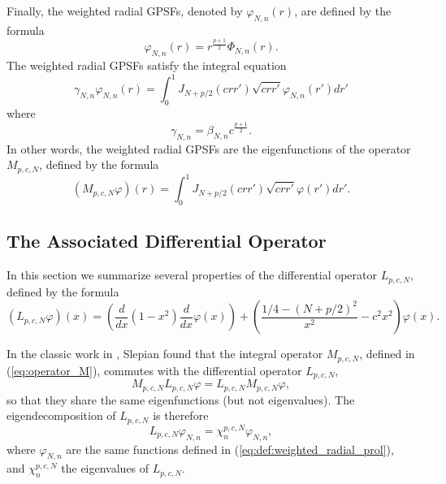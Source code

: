 \documentclass[12pt]{article}
\begin{document}
Finally, the weighted radial GPSFs, denoted by $\varphi_{N,n}(r)$, are defined by the formula
\begin{equation}\label{eq:def:weighted_radial_prol}
\varphi_{N,n}(r) = r^{\frac{p+1}{2}} \Phi_{N,n}(r).
\end{equation}
The weighted radial GPSFs satisfy the integral equation
\begin{equation}\label{eq:weighted_radial_prol:eig}
  \gamma_{N,n} \varphi_{N,n}(r) = \int_0^1 {J_{N+p/2}(crr')} \sqrt{crr'} \varphi_{N,n}(r') dr' 
\end{equation}
where 
\begin{equation}\label{eq:gamma}
  \gamma_{N,n} = \beta_{N,n} c^{\frac{p+1}{2}}.
\end{equation}
In other words, the weighted radial GPSFs are the eigenfunctions of the operator $M_{p,c,N}$, defined by the formula
\begin{equation}\label{eq:operator_M}
 \left( M_{p,c,N} \varphi \right)(r) = \int_0^1 {J_{N+p/2}(crr')} \sqrt{crr'} \varphi(r') dr' .
\end{equation}



%
%
%
\subsection{The Associated Differential Operator}

In this section we summarize several properties of the differential operator 
$L_{p,c,N}$, defined by the formula
\begin{equation}\label{eq:operator_L}
   \left( L_{p,c,N} \varphi \right)(x) = \left( \frac{d}{dx}(1-x^2)\frac{d}{dx}\varphi(x) \right) + \left( \frac{1/4-(N+p/2)^2}{x^2} -c^2 x^2\right)\varphi(x).
\end{equation}


In the classic work in \cite{slepian1964prolate}, 
Slepian found that the integral operator $M_{p,c,N}$,  defined in (\ref{eq:operator_M}), commutes with the differential operator $L_{p,c,N}$,
\begin{equation}
  M_{p,c,N} L_{p,c,N} \varphi =   L_{p,c,N} M_{p,c,N} \varphi,
\end{equation}
so that they share the same eigenfunctions (but not eigenvalues).
The eigendecomposition of $L_{p,c,N}$ is therefore 
\begin{equation}\label{eq:operator_L:eig}
   L_{p,c,N} \varphi_{N,n}  = \chi^{p,c,N}_n \varphi_{N,n}, 
\end{equation}
where $\varphi_{N,n}$ are the same functions defined in (\ref{eq:def:weighted_radial_prol}), 
and $\chi^{p,c,N}_n$ the eigenvalues of $L_{p,c,N}$. 
\end{document}
